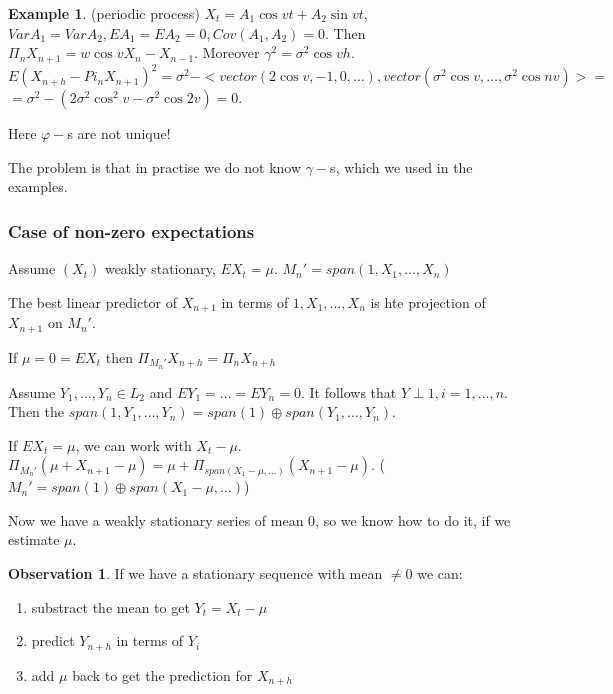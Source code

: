 \documentclass[12pt,a4paper]{amsart}
\theoremstyle{definition} %
\newtheorem{example}[defn]{Example}
\newtheorem{observation}[defn]{Observation}
\theoremstyle{plain} %
\begin{document}
\begin{example} (periodic process)
$X_t = A_1 \cos{vt} + A_2 \sin{vt}$, $Var A_1 = Var A_2, EA_1 = EA_2 = 0, Cov(A_1, A_2) = 0$.
Then 
$\Pi_n X_{n+1} = w \cos{v} X_n - X_{n-1} $. Moreover $\gamma^2 = \sigma^2 \cos{vh}$. 
$E(X_{n+h} - Pi_nX_{n+1})^2 = \sigma^2 - <vector(2 \cos{v}, -1, 0, \dots), vector(\sigma^2\cos{v}, \dots, \sigma^2 \cos{n v})> = $
$= \sigma^2 - (2 \sigma^2 \cos^2{v} - \sigma^2 \cos{2v}) = 0$.

Here $\varphi-$s are not unique! 
\end{example}

The problem is that in practise we do not know $\gamma-$s, which we used in the examples.

\subsubsection{Case of non-zero expectations}

Assume $(X_t)$ weakly stationary, $E X_t = \mu$.
$M_n' = span(1, X_1, \dots, X_n)$

The best linear predictor of $X_{n+1}$ in terms of $1, X_1, \dots, X_n$ is hte projection of $X_{n+1}$ on $M_n'$.

If $\mu = 0 = E X_t$ then $\Pi_{M_n'}X_{n+h} = \Pi_n X_{n+h}$

Assume $Y_1, \dots, Y_n \in L_2$ and $EY_1 = \dots = EY_n = 0$. It follows that $Y \perp 1, i = 1, \dots, n$.  Then the 
$span(1, Y_1, \dots, Y_n) = span(1) \oplus span(Y_1, \dots, Y_n)$.

If $E X_t = \mu$, we can work with $X_t - \mu$. $\Pi_{M_n'}(\mu + X_{n+1} - \mu) = \mu + \Pi_{span(X_1 - \mu, \dots)}(X_{n+1}- \mu)$.
($M_n' = span(1) \oplus span(X_1 - \mu, \dots)$)

Now we have a weakly stationary series of mean $0$, so we know how to do it, if we estimate $\mu$. 

\begin{observation}
If we have a stationary sequence with mean $\neq 0$ we can:
\begin{enumerate}
\item substract the mean to get $Y_t = X_t - \mu$
\item predict $Y_{n+h}$ in terms of $Y_i$
\item add $\mu$ back to get the prediction for $X_{n+h}$
\end{enumerate}
\end{observation}
\end{document}
